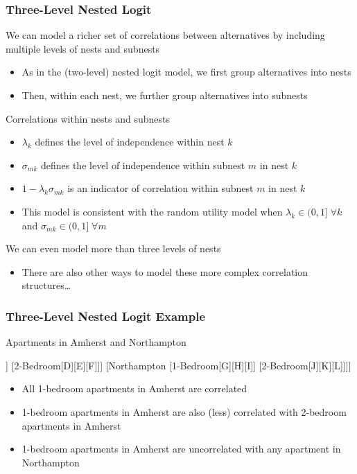 \documentclass{beamer}
\begin{document}
\begin{frame}\frametitle{Three-Level Nested Logit}
    We can model a richer set of correlations between alternatives by including multiple levels of nests and subnests
    \begin{itemize}
    	\item As in the (two-level) nested logit model, we first group alternatives into nests
    	\item Then, within each nest, we further group alternatives into subnests
    \end{itemize}
    \vspace{2ex}
    Correlations within nests and subnests
    \begin{itemize}
    	\item $\lambda_k$ defines the level of independence within nest $k$
    	\item $\sigma_{mk}$ defines the level of independence within subnest $m$ in nest $k$
    	\item $1 - \lambda_k \sigma_{mk}$ is an indicator of correlation within subnest $m$ in nest $k$
    	\item This model is consistent with the random utility model when $\lambda_k \in (0, 1] \; \forall k$ and $\sigma_{mk} \in (0, 1] \; \forall m$
    \end{itemize}
    \vspace{2ex}
    We can even model more than three levels of nests
    \begin{itemize}
    	\item There are also other ways to model these more complex correlation structures\ldots
    \end{itemize}
\end{frame}

\begin{frame}\frametitle{Three-Level Nested Logit Example}
    Apartments in Amherst and Northampton \\
    \vspace{1ex}
    \centering
    \begin{forest}
    	[Renter [Amherst [1-Bedroom[A][B][C]] [2-Bedroom[D][E][F]]] [Northampton [1-Bedroom[G][H][I]] [2-Bedroom[J][K][L]]]]
    \end{forest}
    \begin{itemize}
    	\item All 1-bedroom apartments in Amherst are correlated
    	\item 1-bedroom apartments in Amherst are also (less) correlated with 2-bedroom apartments in Amherst
    	\item 1-bedroom apartments in Amherst are uncorrelated with any apartment in Northampton
    \end{itemize}
\end{frame}
\end{document}
